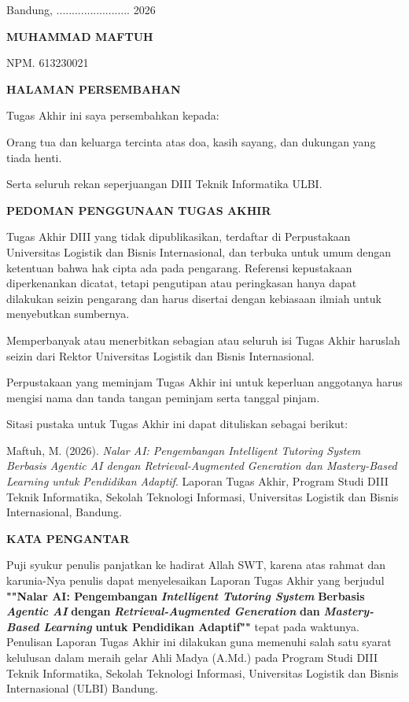 \documentclass[12pt,a4paper]{article}
\begin{document}
Bandung, ........................ 2026

\textbf{MUHAMMAD MAFTUH}

NPM. 613230021

\newpage
\textbf{HALAMAN PERSEMBAHAN}

Tugas Akhir ini saya persembahkan kepada:

Orang tua dan keluarga tercinta atas doa, kasih sayang, dan dukungan yang tiada henti.

Serta seluruh rekan seperjuangan DIII Teknik Informatika ULBI.

\newpage
\textbf{PEDOMAN PENGGUNAAN TUGAS AKHIR}

Tugas Akhir DIII yang tidak dipublikasikan, terdaftar di Perpustakaan Universitas Logistik dan Bisnis Internasional, dan terbuka untuk umum dengan ketentuan bahwa hak cipta ada pada pengarang. Referensi kepustakaan diperkenankan dicatat, tetapi pengutipan atau peringkasan hanya dapat dilakukan seizin pengarang dan harus disertai dengan kebiasaan ilmiah untuk menyebutkan sumbernya.

Memperbanyak atau menerbitkan sebagian atau seluruh isi Tugas Akhir haruslah seizin dari Rektor Universitas Logistik dan Bisnis Internasional.

Perpustakaan yang meminjam Tugas Akhir ini untuk keperluan anggotanya harus mengisi nama dan tanda tangan peminjam serta tanggal pinjam.

Sitasi pustaka untuk Tugas Akhir ini dapat dituliskan sebagai berikut:

Maftuh, M. (2026). \textit{Nalar AI: Pengembangan Intelligent Tutoring System Berbasis Agentic AI dengan Retrieval-Augmented Generation dan Mastery-Based Learning untuk Pendidikan Adaptif}. Laporan Tugas Akhir, Program Studi DIII Teknik Informatika, Sekolah Teknologi Informasi, Universitas Logistik dan Bisnis Internasional, Bandung.

\newpage
\textbf{KATA PENGANTAR}

Puji syukur penulis panjatkan ke hadirat Allah SWT, karena atas rahmat dan karunia-Nya penulis dapat menyelesaikan Laporan Tugas Akhir yang berjudul \textbf{""Nalar AI: Pengembangan} \textbf{\textit{Intelligent Tutoring System}} \textbf{Berbasis} \textbf{\textit{Agentic AI}} \textbf{dengan} \textbf{\textit{Retrieval-Augmented Generation}} \textbf{dan} \textbf{\textit{Mastery-Based Learning}} \textbf{untuk Pendidikan Adaptif""} tepat pada waktunya. Penulisan Laporan Tugas Akhir ini dilakukan guna memenuhi salah satu syarat kelulusan dalam meraih gelar Ahli Madya (A.Md.) pada Program Studi DIII Teknik Informatika, Sekolah Teknologi Informasi, Universitas Logistik dan Bisnis Internasional (ULBI) Bandung.
\end{document}

